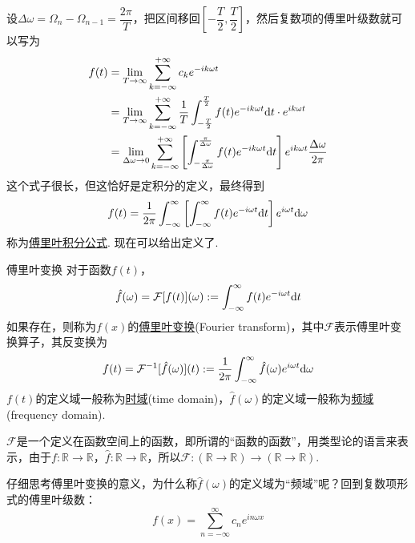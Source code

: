 \documentclass[main.tex]{subfiles}
\begin{document}
\vspace{0.5cm}

设\(\Delta\omega=\Omega_n-\Omega_{n-1}=\dfrac{2\pi}{T}\)，把区间移回\([-\dfrac{T}{2},\dfrac{T}{2}]\)，然后复数项的傅里叶级数就可以写为
\begin{align*}
    f(t) &= \lim_{T \to \infty}\sum_{k=-\infty}^{+\infty}c_ke^{-ik\omega t} \\
    &= \lim_{T \to \infty}\sum_{k=-\infty}^{+\infty}\frac{1}{T} \int_{-\frac{T}{2}}^{\frac{T}{2}}f(t)e^{-ik\omega t}{\rm d}t\cdot e^{ik\omega t} \\
    &= \lim_{\Delta\omega \to 0}\sum_{k=-\infty}^{+\infty} \left[\int_{-\frac{\pi}{\Delta\omega}}^{\frac{\pi}{\Delta\omega}}f(t)e^{-ik\omega t}{\rm d}t \right]e^{ik\omega t}\frac{\Delta\omega}{2\pi}
\end{align*}
这个式子很长，但这恰好是定积分的定义，最终得到
\[ f(t) = \frac{1}{2\pi}\int_{-\infty}^{\infty} \left[\int_{-\infty}^{\infty}f(t)e^{-i\omega t}{\rm d}t \right]e^{i\omega t}{\rm d}\omega \]
称为\uline{傅里叶积分公式}. 现在可以给出定义了.

\begin{definition}{傅里叶变换}
    对于函数\(f(t)\)，
    \[\hat{f}(\omega) = \mathcal{F}[f(t)](\omega) := \int_{-\infty}^{\infty}f(t)e^{-i\omega t}{\rm d}t\]
    如果存在，则称为\(f(x)\)的\uline{傅里叶变换}(Fourier transform)，其中\(\mathcal{F}\)表示傅里叶变换算子，其反变换为
    \[f(t) = \mathcal{F}^{-1}[\hat{f}(\omega)](t) := \frac{1}{2\pi}\int_{-\infty}^{\infty}\hat{f}(\omega)e^{i\omega t}{\rm d}\omega\]
    \(f(t)\)的定义域一般称为\uline{时域}(time domain)，\(\hat{f}(\omega)\)的定义域一般称为\uline{频域}(frequency domain).
\end{definition}
\(\mathcal{F}\)是一个定义在函数空间上的函数，即所谓的“函数的函数”，用类型论的语言来表示，由于\(f:\mathbb{R}\to\mathbb{R}\)，\(\hat{f}:\mathbb{R}\to\mathbb{R}\)，所以\(\mathcal{F}:(\mathbb{R}\to\mathbb{R})\to(\mathbb{R}\to\mathbb{R})\). 

\vspace{1cm}

仔细思考傅里叶变换的意义，为什么称\(\hat{f}(\omega)\)的定义域为“频域”呢？回到复数项形式的傅里叶级数：
\[f(x) = \sum_{n=-\infty}^{\infty}c_ne^{in\omega x}\]
\end{document}
